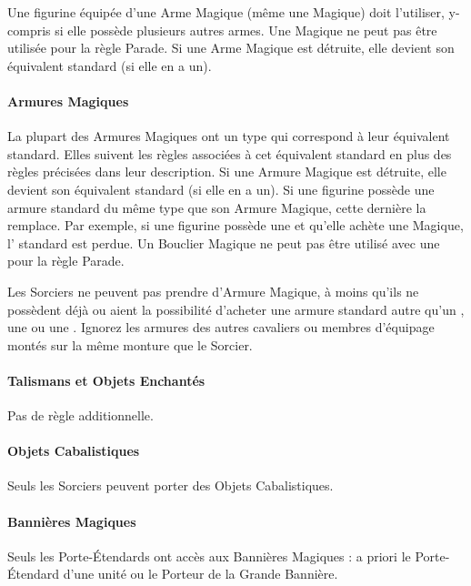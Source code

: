Une figurine équipée d'une Arme Magique (même une \hw{} Magique) doit l'utiliser, y-compris si elle possède plusieurs autres armes. Une \hw{} Magique ne peut pas être utilisée pour la règle Parade. Si une Arme Magique est détruite, elle devient son équivalent standard (si elle en a un).

\paragraph{Armures Magiques}

La plupart des Armures Magiques ont un type qui correspond à leur équivalent standard. Elles suivent les règles associées à cet équivalent standard en plus des règles précisées dans leur description. Si une Armure Magique est détruite, elle devient son équivalent standard (si elle en a un). Si une figurine possède une armure standard du même type que son Armure Magique, cette dernière la remplace. Par exemple, si une figurine possède une \ha{} et qu'elle achète une \la{} Magique, l'\ha{} standard est perdue. Un Bouclier Magique ne peut pas être utilisé avec une \hw{} pour la règle Parade.

Les Sorciers ne peuvent pas prendre d'Armure Magique, à moins qu'ils ne possèdent déjà ou aient la possibilité d'acheter une armure standard autre qu'un \barding{}, une \innatedefence{} ou une \mountsprotection{}. Ignorez les armures des autres cavaliers ou membres d'équipage montés sur la même monture que le Sorcier.

\paragraph{Talismans et Objets Enchantés}

Pas de règle additionnelle.

\paragraph{Objets Cabalistiques}

Seuls les Sorciers peuvent porter des Objets Cabalistiques.

\paragraph{Bannières Magiques}

Seuls les Porte-Étendards ont accès aux Bannières Magiques : a priori le Porte-Étendard d'une unité ou le Porteur de la Grande Bannière.

